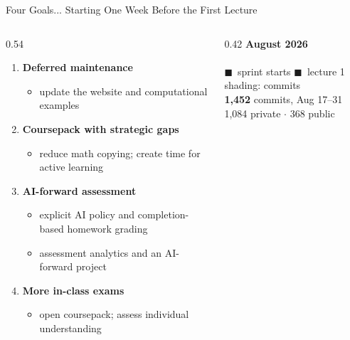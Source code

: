\begin{frame}{Four Goals... Starting One Week Before the First Lecture}
  \vfill
  \begin{columns}[c]
    \begin{column}{0.54\textwidth}
      \begin{enumerate}\footnotesize\setlength\itemsep{0.45em}
        \item \textbf{Deferred maintenance}
          \begin{itemize}\footnotesize\item update the website and computational examples\end{itemize}
        \item \textbf{Coursepack with strategic gaps}
          \begin{itemize}\footnotesize\item reduce math copying; create time for active learning\end{itemize}
        \item \textbf{AI-forward assessment}
          \begin{itemize}\footnotesize\item explicit AI policy and completion-based homework grading
            \item assessment analytics and an AI-forward project\end{itemize}
        \item \textbf{More in-class exams}
          \begin{itemize}\footnotesize\item open coursepack; assess individual understanding\end{itemize}
      \end{enumerate}
    \end{column}
    \begin{column}{0.42\textwidth}
      \centering
      {\small\textbf{August 2026}}\\[0.25em]
      \\[0.4em]
      {\scriptsize\textcolor{NDGold!80!black}{$\blacksquare$}~sprint starts\quad
        \textcolor{NDBlue}{$\blacksquare$}~lecture 1\quad
        \textcolor{Muted}{shading: commits}}\\[0.45em]
      {\small \textbf{1{,}452} commits, Aug 17--31\\[0.2em]
      \textcolor{Muted}{1{,}084 private $\cdot$ 368 public}}
    \end{column}
  \end{columns}
  \vspace{0.45cm plus 1fill}
\end{frame}

